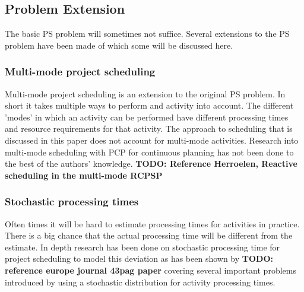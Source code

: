 \documentclass{article}
\newcommand{\TODO}[1]{{\color{red}\textbf{TODO: #1}}}
\begin{document}
\subsection{Problem Extension}
The basic PS problem will sometimes not suffice. Several extensions to the PS problem have been made of which some will be discussed here. 

\subsubsection{Multi-mode project scheduling}
Multi-mode project scheduling is an extension to the original PS problem. In short it takes multiple ways to perform and activity into account. The different 'modes' in which an activity can be performed have different processing times and resource requirements for that activity. The approach to scheduling that is discussed in this paper does not account for multi-mode activities. Research into multi-mode scheduling with PCP for continuous planning has not been done to the best of the authors' knowledge. 
\TODO{Reference Herroelen, Reactive scheduling in the multi-mode RCPSP}

\subsubsection{Stochastic processing times}
Often times it will be hard to estimate processing times for activities in practice. There is a big chance that the actual processing time will be  different from the estimate. In depth research has been done on stochastic processing time for project scheduling to model this deviation as has been shown by \TODO{reference europe journal 43pag paper} covering several important problems introduced by using a stochastic distribution for activity processing times. 
\end{document}
